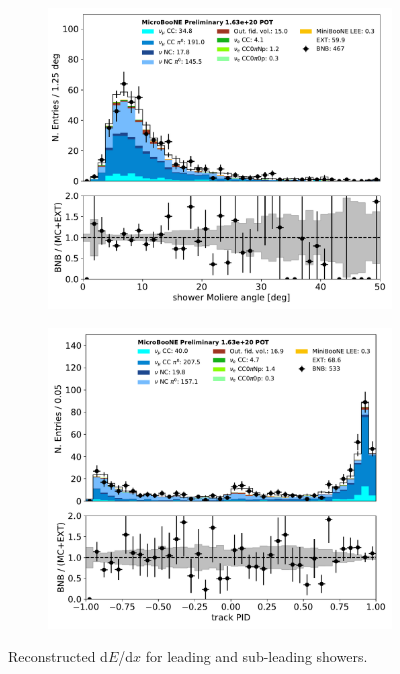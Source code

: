 \documentclass[a4paper]{article}
\begin{document}
\begin{figure}[H]
\begin{center}
    \begin{subfigure}[b]{0.38\textwidth}
    \centering
    \includegraphics[width=1.00\textwidth]{pi0/shrmoliereavg_01152020_scaled_RUN3.pdf}
    \end{subfigure}
    \begin{subfigure}[b]{0.38\textwidth}
    \centering
    \includegraphics[width=1.00\textwidth]{pi0/trkpid_01152020_scaled_RUN3.pdf}
    \end{subfigure}
    
\caption{\label{fig:pi0:datamc}Reconstructed d$E$/d$x$ for leading and sub-leading showers.}
\end{center}
\end{figure}
\end{document}
